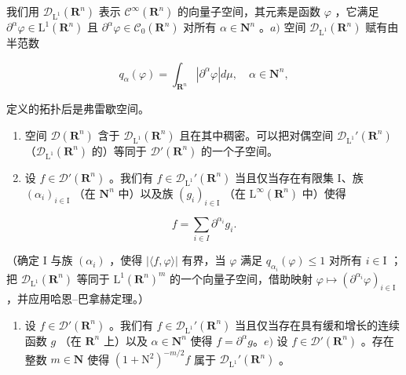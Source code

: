 我们用 \(\mathcal{D}_{\mathrm{L}^{1}}(\mathbf{R}^{n})\) 表示 \(\mathcal{C}^{\infty}(\mathbf{R}^{n})\) 的向量子空间，其元素是函数 \(\varphi\) ，它满足 \(\partial^{\alpha}\varphi\in\mathrm{L}^{1}(\mathbf{R}^{n})\) 且 \(\partial^{\alpha}\varphi\in\mathcal{C}_{0}(\mathbf{R}^{n})\) 对所有 \(\alpha\in\mathbf{N}^{n}\) 。\(a)\) 空间 \(\mathcal{D}_{\mathrm{L}^{1}}(\mathbf{R}^{n})\) 赋有由半范数

\[
q _ {\alpha} (\varphi) = \int_ {\mathbf {R} ^ {n}} | \partial^ {\alpha} \varphi | d \mu , \quad \alpha \in \mathbf {N} ^ {n},
\]

定义的拓扑后是弗雷歇空间。

\begin{enumerate}
\def\labelenumi{\alph{enumi})}
\setcounter{enumi}{1}
\item
  空间 \(\mathcal{D}(\mathbf{R}^n)\) 含于 \(\mathcal{D}_{\mathrm{L}^1}(\mathbf{R}^n)\) 且在其中稠密。可以把对偶空间 \(\mathcal{D}_{\mathrm{L}^1}'(\mathbf{R}^n)\) （\(\mathcal{D}_{\mathrm{L}^1}(\mathbf{R}^n)\) 的）等同于 \(\mathcal{D}'(\mathbf{R}^n)\) 的一个子空间。
\item
  设 \(f \in \mathcal{D}'(\mathbf{R}^n)\) 。我们有 \(f \in \mathcal{D}_{\mathrm{L}^1}'(\mathbf{R}^n)\) 当且仅当存在有限集 I、族 \((\alpha_i)_{i \in \mathrm{I}}\) （在 \(\mathbf{N}^n\) 中）以及族 \((g_i)_{i \in \mathrm{I}}\) （在 \(\mathrm{L}^\infty(\mathbf{R}^n)\) 中）使得
\end{enumerate}

\[
f = \sum_ {i \in I} \partial^ {\alpha_ {i}} g _ {i}.
\]

（确定 I 与族 \((\alpha_{i})\) ，使得 \(|\langle f,\varphi\rangle |\) 有界，当 \(\varphi\) 满足 \(q_{\alpha_i}(\varphi)\leqslant 1\) 对所有 \(i\in \mathrm{I}\) ；把 \(\mathcal{D}_{\mathrm{L}^1}(\mathbf{R}^n)\) 等同于 \(\mathrm{L}^1 (\mathbf{R}^n)^m\) 的一个向量子空间，借助映射 \(\varphi \mapsto (\partial^{\alpha_i}\varphi)_{i\in \mathrm{I}}\) ，并应用哈恩–巴拿赫定理。）

\begin{enumerate}
\def\labelenumi{\alph{enumi})}
\setcounter{enumi}{3}
\tightlist
\item
  设 \(f \in \mathcal{D}'(\mathbf{R}^n)\) 。我们有 \(f \in \mathcal{D}_{\mathrm{L}^1}'(\mathbf{R}^n)\) 当且仅当存在具有缓和增长的连续函数 \(g\) （在 \(\mathbf{R}^n\) 上）以及 \(\alpha \in \mathbf{N}^n\) 使得 \(f = \partial^\alpha g\)。\(e)\) 设 \(f \in \mathcal{D}'(\mathbf{R}^n)\) 。存在整数 \(m \in \mathbf{N}\) 使得 \((1 + \mathrm{N}^2)^{-m/2}f\) 属于 \(\mathcal{D}_{\mathrm{L}^1}'(\mathbf{R}^n)\) 。
\end{enumerate}

